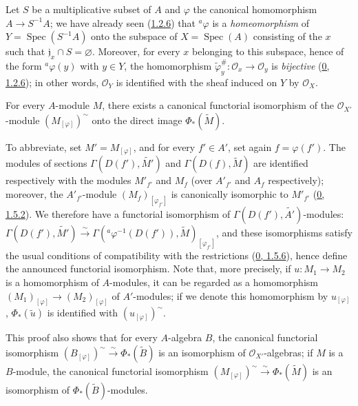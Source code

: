 \begin{example}[1.6.2]
\label{I.1.6.2}
Let $S$ be a multiplicative subset of $A$ and $\varphi$ the canonical
homomorphism $A\to S^{-1}A$; we have already seen
(\hyperref[I.1.2.6]{1.2.6}) that ${}^a\varphi$ is a
\emph{homeomorphism} of $Y=\operatorname{Spec}(S^{-1}A)$ onto the
subspace of $X=\operatorname{Spec}(A)$ consisting of the $x$ such that
$\mathfrak{j}_x\cap S=\varnothing$. Moreover, for every $x$ belonging to
this subspace, hence of the form ${}^a\varphi(y)$ with $y\in Y$,
the homomorphism
$\widetilde{\varphi}_y^\#:\mathscr{O}_x\to\mathscr{O}_y$ is
\emph{bijective} (\hyperref[0.1.2.6]{0, 1.2.6}); in other words,
$\mathscr{O}_Y$ is identified with the sheaf induced on $Y$ by
$\mathscr{O}_X$.
\end{example}

\begin{proposition}[1.6.3]
\label{I.1.6.3}
For every $A$-module $M$, there exists a canonical functorial isomorphism of
the $\mathscr{O}_{X'}$-module $(M_{[\varphi]})^{\sim}$ onto the direct image
$\Phi_*(\widetilde{M})$.
\end{proposition}

To abbreviate, set $M'=M_{[\varphi]}$, and for every $f'\in A'$, set
again $f=\varphi(f')$. The modules of sections
$\Gamma(D(f'),\widetilde{M'})$ and $\Gamma(D(f),\widetilde{M})$
are identified respectively with the modules $M'_{f'}$ and $M_f$ (over
$A'_{f'}$ and $A_f$ respectively); moreover, the $A'_{f'}$-module
$(M_f)_{[\varphi_{f'}]}$ is canonically isomorphic to $M'_{f'}$
(\hyperref[0.1.5.2]{0, 1.5.2}). We therefore have a functorial
isomorphism of $\Gamma(D(f'),\widetilde{A'})$-modules:
$\Gamma(D(f'),\widetilde{M'})\xrightarrow{\sim}
\Gamma({}^a\varphi^{-1}(D(f')),\widetilde{M})_{[\varphi_{f'}]}$, and these
isomorphisms satisfy the usual conditions of compatibility with the
restrictions (\hyperref[0.1.5.6]{0, 1.5.6}), hence define the announced
functorial isomorphism. Note that, more precisely, if
$u:M_1\to M_2$ is a homomorphism of $A$-modules, it can be regarded as a
homomorphism $(M_1)_{[\varphi]}\to(M_2)_{[\varphi]}$ of
$A'$-modules; if we denote this homomorphism by $u_{[\varphi]}$,
$\Phi_*(\widetilde{u})$ is identified with $(u_{[\varphi]})^{\sim}$.

This proof also shows that for every $A$-algebra $B$, the
canonical functorial isomorphism
$(B_{[\varphi]})^{\sim}\xrightarrow{\sim}\Phi_*(\widetilde{B})$ is an
isomorphism of $\mathscr{O}_{X'}$-algebras; if $M$ is a $B$-module,
the canonical functorial isomorphism
$(M_{[\varphi]})^{\sim}\xrightarrow{\sim}\Phi_*(\widetilde{M})$ is an
isomorphism of $\Phi_*(\widetilde{B})$-modules.

